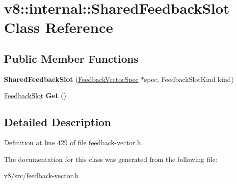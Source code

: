 \hypertarget{classv8_1_1internal_1_1SharedFeedbackSlot}{}\section{v8\+:\+:internal\+:\+:Shared\+Feedback\+Slot Class Reference}
\label{classv8_1_1internal_1_1SharedFeedbackSlot}
\subsection*{Public Member Functions}
\begin{DoxyCompactItemize}
\item 
\mbox{\label{classv8_1_1internal_1_1SharedFeedbackSlot_a78547670a73bab9cb9adaba4e4704951}} 
{\bfseries Shared\+Feedback\+Slot} (\mbox{\hyperlink{classv8_1_1internal_1_1FeedbackVectorSpec}{Feedback\+Vector\+Spec}} $\ast$spec, Feedback\+Slot\+Kind kind)
\item 
\mbox{\label{classv8_1_1internal_1_1SharedFeedbackSlot_a7dbf84f69efebb303caeb085d50a0e65}} 
\mbox{\hyperlink{classv8_1_1internal_1_1FeedbackSlot}{Feedback\+Slot}} {\bfseries Get} ()
\end{DoxyCompactItemize}


\subsection{Detailed Description}


Definition at line 429 of file feedback-\/vector.\+h.



The documentation for this class was generated from the following file\+:\begin{DoxyCompactItemize}
\item 
v8/src/feedback-\/vector.\+h\end{DoxyCompactItemize}
